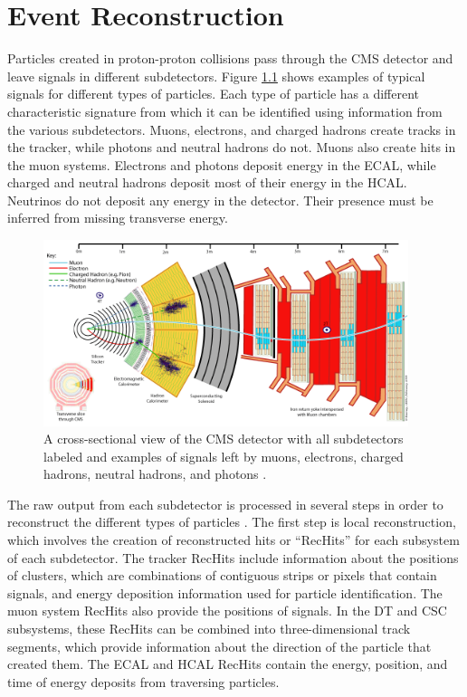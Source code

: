 \chapter{Event Reconstruction
\label{ch:reconstruction}}

Particles created in proton-proton collisions pass through the CMS detector and leave signals in different subdetectors. Figure \ref{fig:cms-slice} shows examples of typical signals for different types of particles. Each type of particle has a different characteristic signature from which it can be identified using information from the various subdetectors. Muons, electrons, and charged hadrons create tracks in the tracker, while photons and neutral hadrons do not. Muons also create hits in the muon systems. Electrons and photons deposit energy in the ECAL, while charged and neutral hadrons deposit most of their energy in the HCAL. Neutrinos do not deposit any energy in the detector. Their presence must be inferred from missing transverse energy.

\begin{figure}[hbt]
\begin{center}
\includegraphics[width=0.95\textwidth]{figures/CMS_slice.png}
\caption{A cross-sectional view of the CMS detector with all subdetectors labeled and examples of signals left by muons, electrons, charged hadrons, neutral hadrons, and photons \cite{CMS-slice}.}
\label{fig:cms-slice}
\end{center}
\end{figure}

The raw output from each subdetector is processed in several steps in order to reconstruct the different types of particles \cite{TDR-software}. The first step is local reconstruction, which involves the creation of reconstructed hits or ``RecHits'' for each subsystem of each subdetector. The tracker RecHits include information about the positions of clusters, which are combinations of contiguous strips or pixels that contain signals, and energy deposition information used for particle identification. The muon system RecHits also provide the positions of signals. In the DT and CSC subsystems, these RecHits can be combined into three-dimensional track segments, which provide information about the direction of the particle that created them. The ECAL and HCAL RecHits contain the energy, position, and time of energy deposits from traversing particles.

